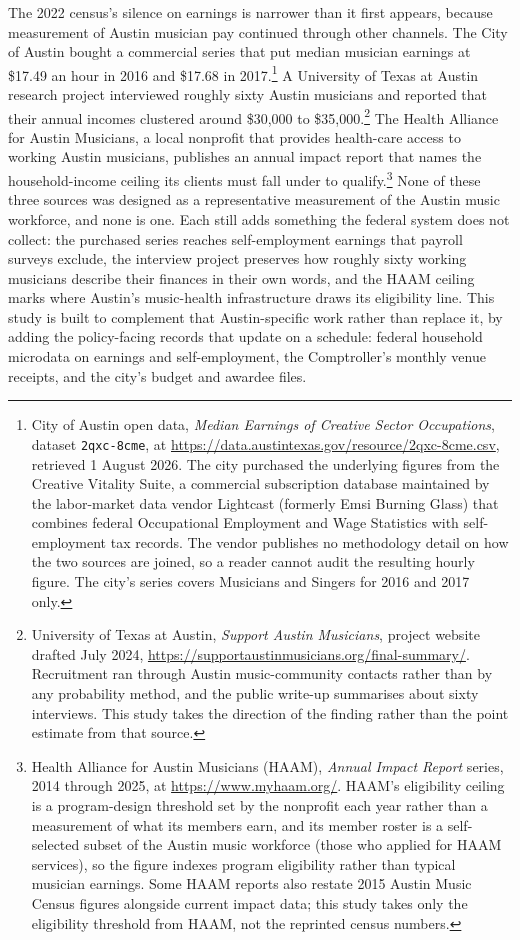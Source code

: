 The 2022 census's silence on earnings is narrower than it first appears,
because measurement of Austin musician pay continued through other
channels. The City of Austin bought a commercial series that put median
musician earnings at \$17.49 an hour in 2016 and \$17.68 in
2017.\footnote{City of Austin open data, \textit{Median Earnings of Creative
Sector Occupations}, dataset \texttt{2qxc-8cme}, at
\url{https://data.austintexas.gov/resource/2qxc-8cme.csv}, retrieved 1 August
2026. The city purchased the underlying figures from the Creative Vitality
Suite, a commercial subscription database maintained by the labor-market data
vendor Lightcast (formerly Emsi Burning Glass) that combines federal
Occupational Employment and Wage Statistics with self-employment tax records.
The vendor publishes no methodology detail on how the two sources are joined,
so a reader cannot audit the resulting hourly figure. The city's series
covers Musicians and Singers for 2016 and 2017 only.} A University of Texas
at Austin research project interviewed roughly sixty Austin
musicians and reported that their annual incomes clustered around \$30,000 to
\$35,000.\footnote{University of Texas at Austin,
\textit{Support Austin Musicians}, project website drafted July 2024,
\url{https://supportaustinmusicians.org/final-summary/}. Recruitment ran
through Austin music-community contacts rather than by any probability
method, and the public write-up summarises about sixty interviews. This
study takes the direction of the finding rather than the point estimate from
that source.} The Health Alliance for Austin Musicians,
a local nonprofit that provides health-care access to working Austin
musicians, publishes an annual impact report that names the household-income
ceiling its clients must fall under to
qualify.\footnote{Health Alliance for Austin Musicians (HAAM),
\textit{Annual Impact Report} series, 2014 through 2025, at
\url{https://www.myhaam.org/}. HAAM's eligibility ceiling is a program-design
threshold set by the nonprofit each year rather than a measurement of what its
members earn, and its member roster is a self-selected subset of the Austin
music workforce (those who applied for HAAM services), so the figure indexes
program eligibility rather than typical musician earnings. Some HAAM reports
also restate 2015 Austin Music Census figures alongside current impact data;
this study takes only the eligibility threshold from HAAM, not the reprinted
census numbers.} None of these three sources was designed as a representative
measurement of the Austin music workforce, and none is one. Each still adds
something the federal system does not collect: the purchased series reaches
self-employment earnings that payroll surveys exclude, the interview project
preserves how roughly sixty working musicians describe their finances in
their own words, and the HAAM ceiling marks where Austin's music-health
infrastructure draws its eligibility line. This study is built to complement
that Austin-specific work rather than replace it, by adding the policy-facing
records that update on a schedule: federal household microdata on earnings
and self-employment, the Comptroller's monthly venue receipts, and the city's
budget and awardee files.

